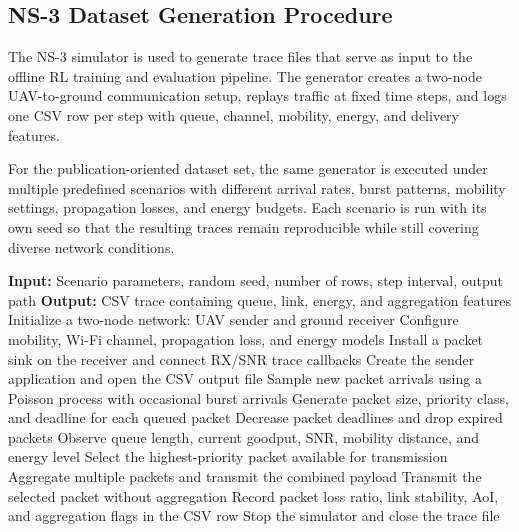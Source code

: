 \subsection{NS-3 Dataset Generation Procedure}

The NS-3 simulator is used to generate trace files that serve as input to the
offline RL training and evaluation pipeline. The generator creates a two-node
UAV-to-ground communication setup, replays traffic at fixed time steps, and
logs one CSV row per step with queue, channel, mobility, energy, and delivery
features.

For the publication-oriented dataset set, the same generator is executed under
multiple predefined scenarios with different arrival rates, burst patterns,
mobility settings, propagation losses, and energy budgets. Each scenario is run
with its own seed so that the resulting traces remain reproducible while still
covering diverse network conditions.

\begin{algorithm}[H]
\caption{NS-3 Trace-Driven Dataset Generation}
\begin{algorithmic}[1]
\State \textbf{Input:} Scenario parameters, random seed, number of rows, step interval, output path
\State \textbf{Output:} CSV trace containing queue, link, energy, and aggregation features
\State Initialize a two-node network: UAV sender and ground receiver
\State Configure mobility, Wi-Fi channel, propagation loss, and energy models
\State Install a packet sink on the receiver and connect RX/SNR trace callbacks
\State Create the sender application and open the CSV output file
    \State Sample new packet arrivals using a Poisson process with occasional burst arrivals
    \State Generate packet size, priority class, and deadline for each queued packet
    \State Decrease packet deadlines and drop expired packets
    \State Observe queue length, current goodput, SNR, mobility distance, and energy level
    \State Select the highest-priority packet available for transmission
        \State Aggregate multiple packets and transmit the combined payload
    \Else
        \State Transmit the selected packet without aggregation
    \EndIf
    \State Record packet loss ratio, link stability, AoI, and aggregation flags in the CSV row
\EndFor
\State Stop the simulator and close the trace file
\end{algorithmic}
\end{algorithm}

